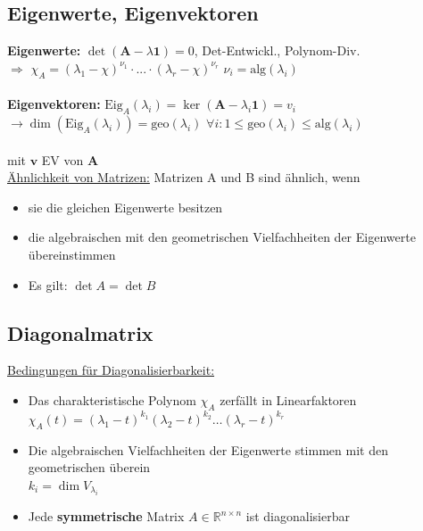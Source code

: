 \documentclass[6pt,a4paper]{scrartcl}
\newcommand{\ma}[1]{\ensuremath{\boldsymbol {#1}}}												%
\renewcommand{\vec}[1]{\ensuremath{\boldsymbol {#1}}}											%
\renewcommand{\emph}[1]{\textbf{#1}}															%
\newcommand{\Ra}[0]{\ensuremath{\Rightarrow}}									%
\newcommand{\ra}[0]{\ensuremath{\rightarrow}} 									%
\newcommand{\R}{\ensuremath{\mathbb R}}
\begin{document}
\begin{multicols*}{4}
\subsection{Eigenwerte, Eigenvektoren}
\emph{Eigenwerte:} $\det(\ma A - \lambda \ma 1) = 0$, Det-Entwickl., Polynom-Div. \\
$\Ra$ $\chi_A = (\lambda_1 - \chi)^{\nu_1} \cdot ... \cdot (\lambda_r - \chi)^{\nu_r}$ \quad $\nu_i = \mathrm{alg}(\lambda_i)$\\ \\
\emph{Eigenvektoren:} $\mathrm{Eig}_A (\lambda_i) = \ker(\ma A - \lambda_i \ma 1) = v_i$\\
$\ra \dim(\mathrm{Eig}_A (\lambda_i)) = \mathrm{geo}(\lambda_i)$ \quad $\forall i : 1 \le \mathrm{geo}(\lambda_i) \le \mathrm{alg}(\lambda_i)$\\ \\
\boxed{\ma A \vec v = \lambda \vec v} mit $\vec v$ EV von $\ma A$ \\
\underline{Ähnlichkeit von Matrizen:} Matrizen A und B sind ähnlich, wenn
\begin{itemize}
	\item sie die gleichen Eigenwerte besitzen
	\item die algebraischen mit den geometrischen Vielfachheiten der Eigenwerte übereinstimmen
	\item Es gilt: $\det A = \det B$
\end{itemize}

\subsection{Diagonalmatrix}

\underline{Bedingungen für Diagonalisierbarkeit:}
\begin{itemize} \itemsep0pt
	\item Das charakteristische Polynom $\chi_{A}$ zerfällt in Linearfaktoren\\
	$\chi_{A}(t) = (\lambda_1 - t)^{k_1}(\lambda_2 - t)^{k_2}\ldots(\lambda_r - t)^{k_r}$
	\item Die algebraischen Vielfachheiten der Eigenwerte stimmen mit den geometrischen überein\\
	$k_i = \dim V_{\lambda_i}$
	\item Jede \textbf{symmetrische} Matrix $A \in \R^{n \times n}$ ist diagonalisierbar
\end{itemize}


\end{multicols*}
\end{document}
